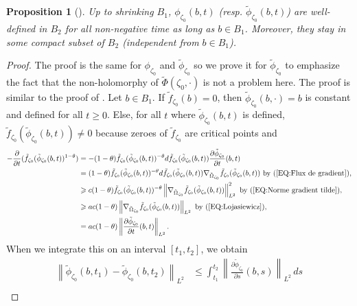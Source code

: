 \documentclass{article}
\newtheorem{proposition}[theorem]{Proposition}
\theoremstyle{remark}
\theoremstyle{definition}
\newcommand{\norme}[1]{\left\| #1 \right\|}
\renewcommand{\leq}{\leqslant}
\renewcommand{\geq}{\geqslant}
\begin{document}
\begin{proposition}[{\cite[Proposition 2.4]{Ortu}}]\label{PRO:Définition et convergence des flux zeta_0}
    Up to shrinking $B_1$, $\phi_{\zeta_0}(b,t)$ (resp. $\tilde{\phi}_{\zeta_0}(b,t)$) are well-defined in $B_2$ for all non-negative time as long as $b \in B_1$. Moreover, they stay in some compact subset of $B_2$ (independent from $b \in B_1$).
\end{proposition}
\begin{proof}
The proof is the same for $\phi_{\zeta_0}$ and $\tilde{\phi}_{\zeta_0}$ so we prove it for $\tilde{\phi}_{\zeta_0}$ to emphasize the fact that the non-holomorphy of $\tilde{\Phi}(\zeta_0,\cdot)$ is not a problem here. The proof is similar to the proof of \cite[Theorem 3.3]{GRS}. Let $b \in B_1$. If $\tilde{f}_{\zeta_0}(b) = 0$, then $\tilde{\phi}_{\zeta_0}(b,\cdot) = b$ is constant and defined for all $t \geq 0$. Else, for all $t$ where $\tilde{\phi}_{\zeta_0}(b,t)$ is defined, $\tilde{f}_{\zeta_0}(\tilde{\phi}_{\zeta_0}(b,t)) \neq 0$ because zeroes of $\tilde{f}_{\zeta_0}$ are critical points and
\begin{align*}
    -\frac{\partial}{\partial t}(\tilde{f}_{\zeta_0}(\tilde{\phi}_{\zeta_0}(b,t))^{1 - \theta}) & = -(1 - \theta)\tilde{f}_{\zeta_0}(\tilde{\phi}_{\zeta_0}(b,t))^{-\theta}d\tilde{f}_{\zeta_0}(\tilde{\phi}_{\zeta_0}(b,t))\frac{\partial \tilde{\phi}_{\zeta_0}}{\partial t}(b,t)\\
    & = (1 - \theta)\tilde{f}_{\zeta_0}(\tilde{\phi}_{\zeta_0}(b,t))^{-\theta}d\tilde{f}_{\zeta_0}(\tilde{\phi}_{\zeta_0}(b,t))\nabla_{\tilde{\Omega}_{\zeta_0}}\tilde{f}_{\zeta_0}(\tilde{\phi}_{\zeta_0}(b,t)) \textrm{ by (\ref{EQ:Flux de gradient}),}\\
    & \geq c(1 - \theta)\tilde{f}_{\zeta_0}(\tilde{\phi}_{\zeta_0}(b,t))^{-\theta}\norme{\nabla_{\tilde{\Omega}_{\zeta_0}}\tilde{f}_{\zeta_0}(\tilde{\phi}_{\zeta_0}(b,t))}_{L^2}^2 \textrm{ by (\ref{EQ:Norme gradient tilde}),}\\
    & \geq ac(1 - \theta)\norme{\nabla_{\tilde{\Omega}_{\zeta_0}}\tilde{f}_{\zeta_0}(\tilde{\phi}_{\zeta_0}(b,t))}_{L^2} \textrm{ by (\ref{EQ:Lojasiewicz}),}\\
    & = ac(1 - \theta)\norme{\frac{\partial\tilde{\phi}_{\zeta_0}}{\partial t}(b,t)}_{L^2}.
\end{align*}
When we integrate this on an interval $[t_1,t_2]$, we obtain
\begin{align}\label{EQ:Lojasiewicz 2}
    \norme{\tilde{\phi}_{\zeta_0}(b,t_1) - \tilde{\phi}_{\zeta_0}(b,t_2)}_{L^2} & \leq \int_{t_1}^{t_2} \norme{\frac{\partial\tilde{\phi}_{\zeta_0}}{\partial s}(b,s)}_{L^2} \, ds \nonumber\\

\end{align}
\end{proof}
\end{document}
